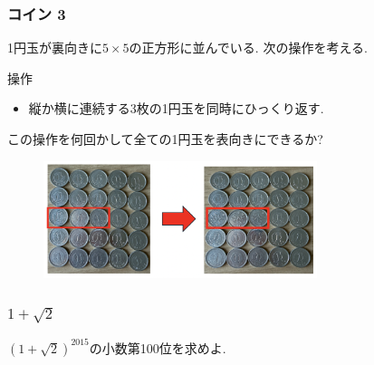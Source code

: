 \documentclass[11pt,dvipdfmx]{beamer}
\theoremstyle{definition}
\theoremstyle{remark}
\begin{document}
\begin{frame}
\frametitle{コイン 3}
1円玉が裏向きに$5 \times 5$の正方形に並んでいる. 次の操作を考える. 
 \begin{block}{操作}
\begin{itemize}
\item 縦か横に連続する3枚の1円玉を同時にひっくり返す.
\end{itemize}
   \end{block}
 この操作を何回かして全ての1円玉を表向きにできるか?
 
 \begin{figure}[htbp]
\begin{center}
\includegraphics[width=80mm]{coin3.png}
\end{center}
\end{figure}

\end{frame}

\begin{frame}
\frametitle{$1 + \sqrt{2}$}
$(1 + \sqrt{2})^{2015}$の小数第100位を求めよ.
\end{frame}
\end{document}
